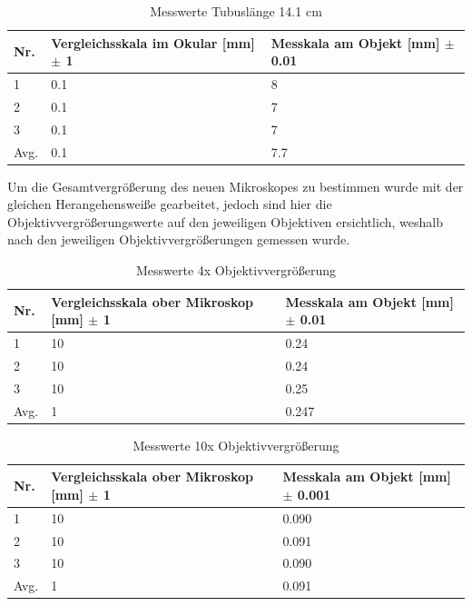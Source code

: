 \documentclass[12pt,a4paper,twoside]{article}
\begin{document}
\begin{table}[H]
    \centering
    \caption{Messwerte Tubuslänge 14.1 cm}
    \label{tab:10XmesswerteTB14}
    \begin{tabular}{| l | l | l |}
        \hline
        Nr.   & Vergleichsskala im Okular [mm] $\pm$ 1 & Messkala am Objekt [mm] $\pm$ 0.01 \\
        \hline
        1 & 0.1 & 8 \\
        2 & 0.1 & 7 \\
        3 & 0.1 & 7 \\
        \hline
        Avg. & 0.1 & 7.7 \\
        \hline
    \end{tabular}
\end{table}

\noindent
Um die Gesamtvergrößerung des neuen Mikroskopes zu bestimmen wurde mit der gleichen Herangehensweiße gearbeitet, jedoch sind hier die Objektivvergrößerungswerte auf den jeweiligen Objektiven ersichtlich, weshalb nach den jeweiligen Objektivvergrößerungen gemessen wurde. 

\begin{table}[H]
    \centering
    \caption{Messwerte 4x Objektivvergrößerung}
    \label{tab:messwerteNM4x}
    \begin{tabular}{| l | l | l |}
        \hline
        Nr.   & Vergleichsskala ober Mikroskop [mm] $\pm$ 1 & Messkala am Objekt [mm] $\pm$ 0.01 \\
        \hline
        1 & 10 & 0.24 \\
        2 & 10 & 0.24 \\
        3 & 10 & 0.25 \\
        \hline
        Avg. & 1 & 0.247 \\
        \hline
    \end{tabular}
\end{table}

\begin{table}[H]
    \centering
    \caption{Messwerte 10x Objektivvergrößerung}
    \label{tab:messwerteNM10x}
    \begin{tabular}{| l | l | l |}
        \hline
        Nr.   & Vergleichsskala ober Mikroskop [mm] $\pm$ 1 & Messkala am Objekt [mm] $\pm$ 0.001 \\
        \hline
        1 & 10 & 0.090 \\
        2 & 10 & 0.091 \\
        3 & 10 & 0.090 \\
        \hline
        Avg. & 1 & 0.091 \\
        \hline
    \end{tabular}
\end{table}
\end{document}
